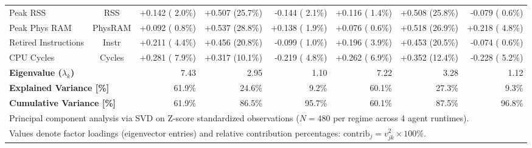 \begin{table}[t]
\begin{tabular}{l c r r r r r r}
Peak RSS & RSS & +0.142 ( 2.0\%) & +0.507 (25.7\%) & -0.144 ( 2.1\%) & +0.116 ( 1.4\%) & +0.508 (25.8\%) & -0.079 ( 0.6\%) \\
Peak Phys RAM & PhysRAM & +0.092 ( 0.8\%) & +0.537 (28.8\%) & +0.138 ( 1.9\%) & +0.076 ( 0.6\%) & +0.518 (26.9\%) & +0.218 ( 4.8\%) \\
Retired Instructions & Instr & +0.211 ( 4.4\%) & +0.456 (20.8\%) & -0.099 ( 1.0\%) & +0.196 ( 3.9\%) & +0.453 (20.5\%) & -0.074 ( 0.6\%) \\
CPU Cycles & Cycles & +0.281 ( 7.9\%) & +0.317 (10.1\%) & -0.219 ( 4.8\%) & +0.262 ( 6.9\%) & +0.352 (12.4\%) & -0.228 ( 5.2\%) \\
\hline
\multicolumn{2}{l}{\textbf{Eigenvalue ($\lambda_k$)}} & 7.43 & 2.95 & 1.10 & 7.22 & 3.28 & 1.12 \\
\multicolumn{2}{l}{\textbf{Explained Variance [\%]}} & 61.9\% & 24.6\% & 9.2\% & 60.1\% & 27.3\% & 9.3\% \\
\multicolumn{2}{l}{\textbf{Cumulative Variance [\%]}} & 61.9\% & 86.5\% & 95.7\% & 60.1\% & 87.5\% & 96.8\% \\
\hline
\multicolumn{8}{l}{\footnotesize Principal component analysis via SVD on Z-score standardized observations ($N=480$ per regime across 4 agent runtimes).} \\
\multicolumn{8}{l}{\footnotesize Values denote factor loadings (eigenvector entries) and relative contribution percentages: $\text{contrib}_j = v_{jk}^2 \times 100\%$.} \\
\hline
\end{tabular}
\end{table}
